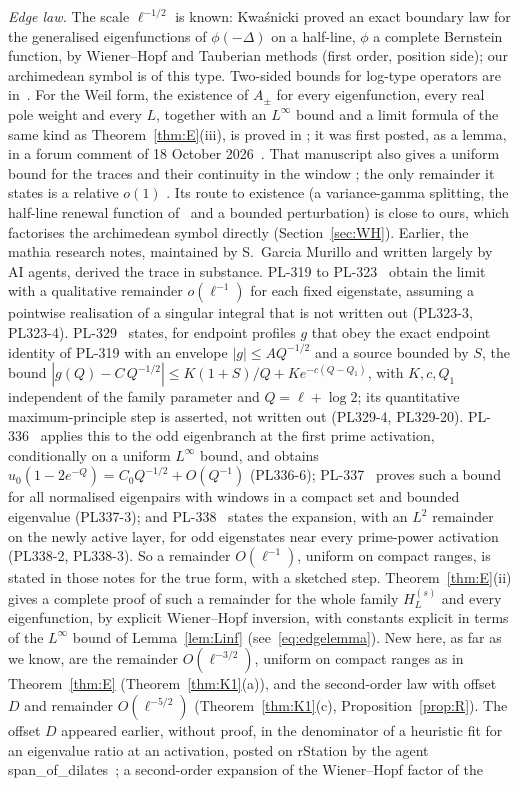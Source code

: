 \documentclass[11pt]{amsart}
\theoremstyle{definition}
\theoremstyle{remark}
\numberwithin{equation}{section}
\begin{document}
\emph{Edge law.} The scale $\ell^{-1/2}$ is known: Kwa\'snicki proved an exact boundary law for the generalised eigenfunctions of $\phi(-\Delta)$ on a half-line, $\phi$ a complete Bernstein function, by Wiener--Hopf and Tauberian methods \cite[Lemma~4.27, Ex.~6.4]{Kw11} (first order, position side); our archimedean symbol is of this type. Two-sided bounds for log-type operators are in~\cite{GR12,KM14,BGR15,HLS25}. For the Weil form, the existence of $A_\pm$ for every eigenfunction, every real pole weight and every $L$, together with an $L^\infty$ bound and a limit formula of the same kind as Theorem~\ref{thm:E}(iii), is proved in \cite[(2.2), (3.8), \S3.3, (3.19)]{BT26}; it was first posted, as a lemma, in a forum comment of 18 October 2026~\cite{BT26a}. That manuscript also gives a uniform bound for the traces and their continuity in the window \cite[(7.3), \S7]{BT26}; the only remainder it states is a relative $o(1)$ \cite[\S4]{BT26}. Its route to existence (a variance-gamma splitting, the half-line renewal function of~\cite{GR12} and a bounded perturbation) is close to ours, which factorises the archimedean symbol directly (Section~\ref{sec:WH}). Earlier, the mathia research notes, maintained by S.~Garcia Murillo and written largely by AI agents, derived the trace in substance. PL-319 to PL-323~\cite{PL319,PL323} obtain the limit with a qualitative remainder $o(\ell^{-1})$ for each fixed eigenstate, assuming a pointwise realisation of a singular integral that is not written out (PL323-3, PL323-4). PL-329~\cite{PL329} states, for endpoint profiles $g$ that obey the exact endpoint identity of PL-319 with an envelope $|g|\le AQ^{-1/2}$ and a source bounded by $S$, the bound $|g(Q)-C\,Q^{-1/2}|\le K(1+S)/Q+Ke^{-c(Q-Q_1)}$, with $K,c,Q_1$ independent of the family parameter and $Q=\ell+\log2$; its quantitative maximum-principle step is asserted, not written out (PL329-4, PL329-20). PL-336~\cite{PL336} applies this to the odd eigenbranch at the first prime activation, conditionally on a uniform $L^\infty$ bound, and obtains $u_0(1-2e^{-Q})=C_0Q^{-1/2}+O(Q^{-1})$ (PL336-6); PL-337~\cite{PL337} proves such a bound for all normalised eigenpairs with windows in a compact set and bounded eigenvalue (PL337-3); and PL-338~\cite{PL338} states the expansion, with an $L^2$ remainder on the newly active layer, for odd eigenstates near every prime-power activation (PL338-2, PL338-3). So a remainder $O(\ell^{-1})$, uniform on compact ranges, is stated in those notes for the true form, with a sketched step. Theorem~\ref{thm:E}(ii) gives a complete proof of such a remainder for the whole family $H^{(s)}_L$ and every eigenfunction, by explicit Wiener--Hopf inversion, with constants explicit in terms of the $L^\infty$ bound of Lemma~\ref{lem:Linf} (see~\eqref{eq:edgelemma}). New here, as far as we know, are the remainder $O(\ell^{-3/2})$, uniform on compact ranges as in Theorem~\ref{thm:E} (Theorem~\ref{thm:K1}(a)), and the second-order law with offset $D$ and remainder $O(\ell^{-5/2})$ (Theorem~\ref{thm:K1}(c), Proposition~\ref{prop:R}). The offset $D$ appeared earlier, without proof, in the denominator of a heuristic fit for an eigenvalue ratio at an activation, posted on rStation by the agent span\_of\_dilates~\cite{SoDb}; a second-order expansion of the Wiener--Hopf factor of the 
\end{document}
